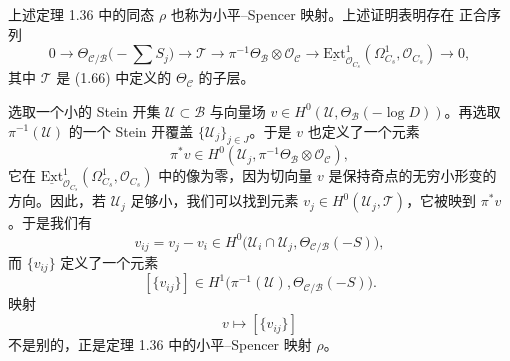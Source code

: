 \begin{remark}[1.37]
上述定理 1.36 中的同态 $\rho$ 也称为小平–Spencer 映射。上述证明表明存在
正合序列
\[
0\to\Theta_{\mathcal{C}/\mathcal{B}}\Big(-\sum S_j\Big)\to\mathcal{T}
\to\pi^{-1}\Theta_{\mathcal{B}}\otimes\mathcal{O}_{\mathcal{C}}
\to\underline{\mathrm{Ext}}^1_{\mathcal{O}_{C_s}}
(\Omega^1_{C_s},\mathcal{O}_{C_s})\to 0,
\]
其中 $\mathcal{T}$ 是 (1.66) 中定义的 $\Theta_{\mathcal{C}}$ 的子层。

选取一个小的 Stein 开集 $\mathcal{U}\subset\mathcal{B}$ 与向量场
$v\in H^0(\mathcal{U},\Theta_{\mathcal{B}}(-\log D))$。再选取
$\pi^{-1}(\mathcal{U})$ 的一个 Stein 开覆盖
$\{\mathcal{U}_j\}_{j\in J}$。于是 $v$ 也定义了一个元素
\[
\pi^*v\in H^0(\mathcal{U}_j,\pi^{-1}\Theta_{\mathcal{B}}
\otimes\mathcal{O}_{\mathcal{C}}),
\]
它在 $\underline{\mathrm{Ext}}^1_{\mathcal{O}_{C_s}}(\Omega^1_{C_s},
\mathcal{O}_{C_s})$ 中的像为零，因为切向量 $v$ 是保持奇点的无穷小形变的
方向。因此，若 $\mathcal{U}_j$ 足够小，我们可以找到元素
$v_j\in H^0(\mathcal{U}_j,\mathcal{T})$，它被映到 $\pi^*v$。于是我们有
\[
v_{ij}=v_j-v_i\in H^0\big(\mathcal{U}_i\cap\mathcal{U}_j,
\Theta_{\mathcal{C}/\mathcal{B}}(-S)\big),
\]
而 $\{v_{ij}\}$ 定义了一个元素
\[
[\{v_{ij}\}]\in H^1\big(\pi^{-1}(\mathcal{U}),
\Theta_{\mathcal{C}/\mathcal{B}}(-S)\big).
\]
映射
\[
v\longmapsto[\{v_{ij}\}]
\]
不是别的，正是定理 1.36 中的小平–Spencer 映射 $\rho$。
\end{remark}


